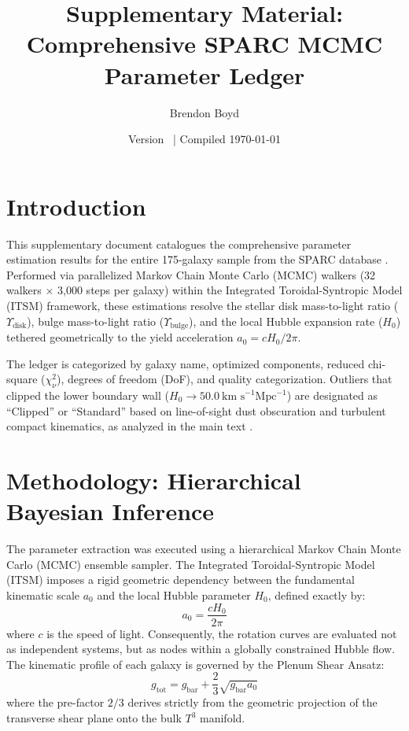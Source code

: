 \documentclass[aps,prd,10pt,onecolumn,superscriptaddress,nofootinbib]{revtex4-2}
\begin{document}
\title{Supplementary Material: Comprehensive SPARC MCMC Parameter Ledger}
\author{Brendon Boyd}
\date{Version \itsmVersion\ | Compiled \today}

\maketitle

\section{Introduction}
This supplementary document catalogues the comprehensive parameter estimation results for the entire 175-galaxy sample from the SPARC database \cite{sparc}. Performed via parallelized Markov Chain Monte Carlo (MCMC) walkers (32 walkers $\times$ 3,000 steps per galaxy) within the Integrated Toroidal-Syntropic Model (ITSM) framework, these estimations resolve the stellar disk mass-to-light ratio ($\Upsilon_{\text{disk}}$), bulge mass-to-light ratio ($\Upsilon_{\text{bulge}}$), and the local Hubble expansion rate ($H_0$) tethered geometrically to the yield acceleration $a_0 = c H_0 / 2\pi$.

The ledger is categorized by galaxy name, optimized components, reduced chi-square ($\chi^2_\nu$), degrees of freedom (DoF), and quality categorization. Outliers that clipped the lower boundary wall ($H_0 \to 50.0 \ \text{km s}^{-1} \text{Mpc}^{-1}$) are designated as ``Clipped'' or ``Standard'' based on line-of-sight dust obscuration and turbulent compact kinematics, as analyzed in the main text \cite{itsm_main}.

\section{Methodology: Hierarchical Bayesian Inference}
The parameter extraction was executed using a hierarchical Markov Chain Monte Carlo (MCMC) ensemble sampler. The Integrated Toroidal-Syntropic Model (ITSM) imposes a rigid geometric dependency between the fundamental kinematic scale $a_0$ and the local Hubble parameter $H_0$, defined exactly by:
\begin{equation}
    a_0 = \frac{c H_0}{2\pi}
\end{equation}
where $c$ is the speed of light. Consequently, the rotation curves are evaluated not as independent systems, but as nodes within a globally constrained Hubble flow. The kinematic profile of each galaxy is governed by the Plenum Shear Ansatz:
\begin{equation}
    g_{\text{tot}} = g_{\text{bar}} + \frac{2}{3} \sqrt{g_{\text{bar}} a_0}
\end{equation}
where the pre-factor $2/3$ derives strictly from the geometric projection of the transverse shear plane onto the bulk $T^3$ manifold.
\end{document}

